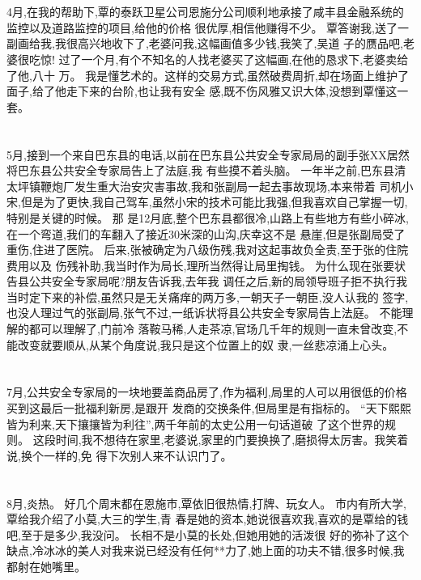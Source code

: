 \documentclass[11pt]{article}
\begin{document}
\section{}
4月,在我的帮助下,覃的泰跃卫星公司恩施分公司顺利地承接了咸丰县金融系统的监控以及道路监控的项目,给他的价格
很优厚,相信他赚得不少。 覃答谢我,送了一副画给我,我很高兴地收下了,老婆问我,这幅画值多少钱,我笑了,吴道
子的赝品吧,老婆很吃惊! 过了一个月,有个不知名的人找老婆买了这幅画,在他的恳求下,老婆卖给了他,八十
万。 我是懂艺术的。这样的交易方式,虽然破费周折,却在场面上维护了面子,给了他走下来的台阶,也让我有安全
感,既不伤风雅又识大体,没想到覃懂这一套。

\section{}
5月,接到一个来自巴东县的电话,以前在巴东县公共安全专家局局的副手张XX居然将巴东县公共安全专家局告上了法庭,我
有些摸不着头脑。 一年半之前,巴东县清太坪镇鞭炮厂发生重大治安灾害事故,我和张副局一起去事故现场,本来带着
司机小宋,但是为了更快,我自己驾车,虽然小宋的技术可能比我强,但我喜欢自己掌握一切,特别是关键的时候。 那
是12月底,整个巴东县都很冷,山路上有些地方有些小碎冰,在一个弯道,我们的车翻入了接近30米深的山沟,庆幸这不是
悬崖,但是张副局受了重伤,住进了医院。 后来,张被确定为八级伤残,我对这起事故负全责,至于张的住院费用以及
伤残补助,我当时作为局长,理所当然得让局里掏钱。 为什么现在张要状告县公共安全专家局呢?朋友告诉我,去年我
调任之后,新的局领导班子拒不执行我当时定下来的补偿,虽然只是无关痛痒的两万多,一朝天子一朝臣,没人认我的
签字,也没人理过气的张副局,张气不过,一纸诉状将县公共安全专家局告上法庭。 不能理解的都可以理解了,门前冷
落鞍马稀,人走茶凉,官场几千年的规则一直未曾改变,不能改变就要顺从,从某个角度说,我只是这个位置上的奴
隶,一丝悲凉涌上心头。

\section{}
7月,公共安全专家局的一块地要盖商品房了,作为福利,局里的人可以用很低的价格买到这最后一批福利新房,是跟开
发商的交换条件,但局里是有指标的。 ``天下熙熙皆为利来,天下攘攘皆为利往'',两千年前的太史公用一句话道破
了这个世界的规则。 这段时间,我不想待在家里,老婆说,家里的门要换换了,磨损得太厉害。我笑着说,换个一样的,免
得下次别人来不认识门了。

\section{}
8月,炎热。 好几个周末都在恩施市,覃依旧很热情,打牌、玩女人。 市内有所大学,覃给我介绍了小莫,大三的学生,青
春是她的资本,她说很喜欢我,喜欢的是覃给的钱吧,至于是多少,我没问。 长相不是小莫的长处,但她用她的活泼很
好的弥补了这个缺点,冷冰冰的美人对我来说已经没有任何**力了,她上面的功夫不错,很多时候,我都射在她嘴里。
\end{document}
